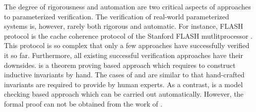 \documentclass[final]{IEEEtran}
\begin{document}
The degree of rigorousness and automation are two critical aspects of approaches to parameterized verification.
The verification of real-world parameterized systems is, however,  rarely  both rigorous and automatic.
{For instance, FLASH protocol is the cache coherence protocol of the Stanford FLASH mutlitprocessor \cite{FLASHCache}. This protocol is so complex that only a few approaches  \cite{Park1996a,McMillan2001,Chou2004,Conchon2013} have successfully verified it so far. Furthermore, all existing  successful verification approaches have their downsides.  \cite{Park1996a} is a theorem proving based approach which requires
to construct inductive invariants by hand. The cases of \cite{McMillan2001} and \cite{Chou2004} are similar to \cite{Park1996a} that hand-crafted invariants are required to
provide by human experts. As a contrast, \cite{Conchon2013} is a model checking based approach which can be carried out automatically. However, the formal proof can not be obtained from the work of \cite{Conchon2013}.
}
\end{document}
